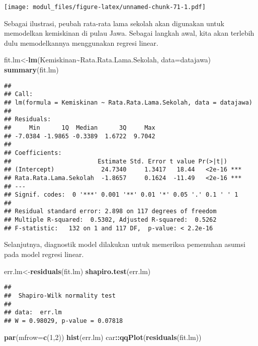 \documentclass[
]{book}
\newenvironment{Shaded}{\begin{snugshade}}{\end{snugshade}}
\newcommand{\DataTypeTok}[1]{\textcolor[rgb]{0.13,0.29,0.53}{#1}}
\newcommand{\DecValTok}[1]{\textcolor[rgb]{0.00,0.00,0.81}{#1}}
\newcommand{\KeywordTok}[1]{\textcolor[rgb]{0.13,0.29,0.53}{\textbf{#1}}}
\newcommand{\NormalTok}[1]{#1}
\newcommand{\OperatorTok}[1]{\textcolor[rgb]{0.81,0.36,0.00}{\textbf{#1}}}
\begin{document}
\texttt{[image: modul\_files/figure-latex/unnamed-chunk-71-1.pdf]}

Sebagai ilustrasi, peubah rata-rata lama sekolah akan digunakan untuk memodelkan kemiskinan di pulau Jawa. Sebagai langkah awal, kita akan terlebih dulu memodelkannya menggunakan regresi linear.

\begin{Shaded}
\begin{Highlighting}[]
\NormalTok{fit.lm\textless{}{-}}\KeywordTok{lm}\NormalTok{(Kemiskinan}\OperatorTok{\textasciitilde{}}\NormalTok{Rata.Rata.Lama.Sekolah, }\DataTypeTok{data=}\NormalTok{datajawa)}
\KeywordTok{summary}\NormalTok{(fit.lm)}
\end{Highlighting}
\end{Shaded}

\begin{verbatim}
## 
## Call:
## lm(formula = Kemiskinan ~ Rata.Rata.Lama.Sekolah, data = datajawa)
## 
## Residuals:
##     Min      1Q  Median      3Q     Max 
## -7.0384 -1.9865 -0.3389  1.6722  9.7042 
## 
## Coefficients:
##                        Estimate Std. Error t value Pr(>|t|)    
## (Intercept)             24.7340     1.3417   18.44   <2e-16 ***
## Rata.Rata.Lama.Sekolah  -1.8657     0.1624  -11.49   <2e-16 ***
## ---
## Signif. codes:  0 '***' 0.001 '**' 0.01 '*' 0.05 '.' 0.1 ' ' 1
## 
## Residual standard error: 2.898 on 117 degrees of freedom
## Multiple R-squared:  0.5302, Adjusted R-squared:  0.5262 
## F-statistic:   132 on 1 and 117 DF,  p-value: < 2.2e-16
\end{verbatim}

Selanjutnya, diagnostik model dilakukan untuk memeriksa pemenuhan asumsi pada model regresi linear.

\begin{Shaded}
\begin{Highlighting}[]
\NormalTok{err.lm\textless{}{-}}\KeywordTok{residuals}\NormalTok{(fit.lm)}
\KeywordTok{shapiro.test}\NormalTok{(err.lm)}
\end{Highlighting}
\end{Shaded}

\begin{verbatim}
## 
##  Shapiro-Wilk normality test
## 
## data:  err.lm
## W = 0.98029, p-value = 0.07818
\end{verbatim}

\begin{Shaded}
\begin{Highlighting}[]
\KeywordTok{par}\NormalTok{(}\DataTypeTok{mfrow=}\KeywordTok{c}\NormalTok{(}\DecValTok{1}\NormalTok{,}\DecValTok{2}\NormalTok{))}
\KeywordTok{hist}\NormalTok{(err.lm)}
\NormalTok{car}\OperatorTok{::}\KeywordTok{qqPlot}\NormalTok{(}\KeywordTok{residuals}\NormalTok{(fit.lm))}
\end{Highlighting}
\end{Shaded}
\end{document}

